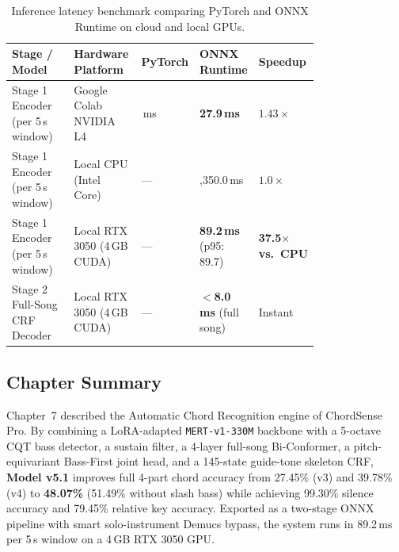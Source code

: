 \documentclass[a4paper]{article}
\begin{document}
\begin{table}[H]
    \centering
    \small
    \begin{tabularx}{\linewidth}{@{}
        >{\raggedright\arraybackslash}p{0.27\linewidth}
        >{\raggedright\arraybackslash}p{0.23\linewidth}
        >{\centering\arraybackslash}p{0.11\linewidth}
        >{\centering\arraybackslash}p{0.16\linewidth}
        >{\centering\arraybackslash}X@{}}
        \toprule
        \textbf{Stage / Model} & \textbf{Hardware Platform} & \textbf{PyTorch} & \textbf{ONNX Runtime} & \textbf{Speedup} \\
        \midrule
        Stage 1 Encoder (per 5\,s window) & Google Colab NVIDIA L4 & 39.9\,ms & \textbf{27.9\,ms} & $1.43\times$ \\
        \addlinespace[2pt]
        Stage 1 Encoder (per 5\,s window) & Local CPU (Intel Core) & --- & 3,350.0\,ms & $1.0\times$ \\
        \addlinespace[2pt]
        Stage 1 Encoder (per 5\,s window) & Local RTX 3050 (4\,GB CUDA) & --- & \textbf{89.2\,ms} {\scriptsize (p95: 89.7)} & \textbf{37.5$\times$ vs.\ CPU} \\
        \addlinespace[2pt]
        Stage 2 Full-Song CRF Decoder & Local RTX 3050 (4\,GB CUDA) & --- & \textbf{$<$8.0\,ms} {\scriptsize (full song)} & Instant \\
        \bottomrule
    \end{tabularx}
    \caption{Inference latency benchmark comparing PyTorch and ONNX Runtime on cloud and local GPUs.}
    \label{tab:onnx_latency}
\end{table}

\subsection{Chapter Summary}

Chapter~7 described the Automatic Chord Recognition engine of ChordSense Pro. By combining a LoRA-adapted \texttt{MERT-v1-330M} backbone with a 5-octave CQT bass detector, a sustain filter, a 4-layer full-song Bi-Conformer, a pitch-equivariant Bass-First joint head, and a 145-state guide-tone skeleton CRF, \textbf{Model v5.1} improves full 4-part chord accuracy from 27.45\% (v3) and 39.78\% (v4) to \textbf{48.07\%} (51.49\% without slash bass) while achieving 99.30\% silence accuracy and 79.45\% relative key accuracy. Exported as a two-stage ONNX pipeline with smart solo-instrument Demucs bypass, the system runs in 89.2\,ms per 5\,s window on a 4\,GB RTX 3050 GPU.
\end{document}
